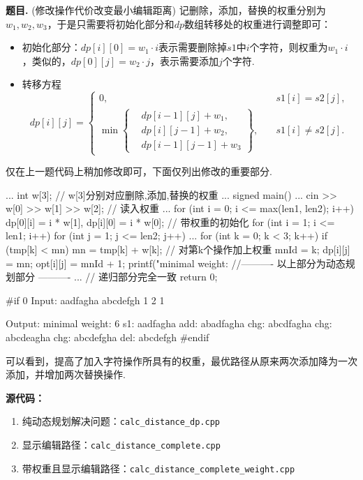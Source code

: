 \documentclass[12pt, a4paper, oneside]{ctexart}
\numberwithin{equation}{section}  %
\newcounter{problem}  %
\newenvironment{problem}[1][]{\stepcounter{problem}\par\noindent\textbf{题目\arabic{problem}. #1}}{\smallskip\par}
\begin{document}
\begin{problem}{(修改操作代价改变最小编辑距离)}
    记删除，添加，替换的权重分别为$w_1,w_2,w_3$，于是只需要将初始化部分和$dp$数组转移处的权重进行调整即可：
    \begin{itemize}
        \item 初始化部分：$dp[i][0] = w_1\cdot i$表示需要删除掉$s1$中$i$个字符，则权重为$w_1\cdot i$，类似的，$dp[0][j] = w_2\cdot j$，表示需要添加$j$个字符.
        \item 转移方程
        \begin{equation*}
            dp[i][j]=\begin{cases}
                0,&\quad s1[i]=s2[j],\\
                \min\left\{\begin{aligned}
                    &dp[i-1][j]+w_1,\\
                    &dp[i][j-1]+w_2,\\
                    &dp[i-1][j-1]+w_3
                \end{aligned}\right\},&\quad s1[i]\neq s2[j].
            \end{cases}
        \end{equation*}
    \end{itemize}
    仅在上一题代码上稍加修改即可，下面仅列出修改的重要部分.
    \begin{cppcode}
...
int w[3];  // w[3]分别对应删除,添加,替换的权重
...
signed main() {
...
    cin >> w[0] >> w[1] >> w[2];  // 读入权重
...
    for (int i = 0; i <= max(len1, len2); i++) dp[0][i] = i * w[1], dp[i][0] = i * w[0];  // 带权重的初始化
    for (int i = 1; i <= len1; i++) {
        for (int j = 1; j <= len2; j++) {
            ...
            for (int k = 0; k < 3; k++) {
                if (tmp[k] < mn) {
                    mn = tmp[k] + w[k];  // 对第k个操作加上权重
                    mnId = k;
                }
            }
            dp[i][j] = mn;
            opt[i][j] = mnId + 1;
        }
    }
    printf("minimal weight: %
    //---------- 以上部分为动态规划部分 ----------
    ...  //  递归部分完全一致
    return 0;
}

#if 0
Input:
aadfagha
abcdefgh
1 2 1

Output:
minimal weight: 6
s1:  aadfagha
add: abadfagha
chg: abcdfagha
chg: abcdeagha
chg: abcdefgha
del: abcdefgh
#endif
    \end{cppcode}
    可以看到，提高了加入字符操作所具有的权重，最优路径从原来两次添加降为一次添加，并增加两次替换操作.
\end{problem}

\textbf{源代码：}
\begin{enumerate}
    \item 纯动态规划解决问题：\texttt{calc\_distance\_dp.cpp}
    \item 显示编辑路径：\texttt{calc\_distance\_complete.cpp}
    \item 带权重且显示编辑路径：\texttt{calc\_distance\_complete\_weight.cpp}
\end{enumerate}
\end{document}
